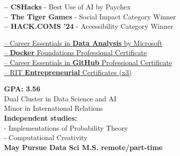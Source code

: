 \documentclass[10pt,a4paper,ragged2e,withhyper]{altacv}
\begin{document}
\begin{paracol}{2}

\textbf{ -- CSHacks} - Best Use of AI by Paychex\\
\textbf{ -- The Tiger Games} - Social Impact Category Winner\\
\textbf{ -- HACK.COMS '24} - Accessibility Category Winner\\

\divider

\href{https://www.linkedin.com/learning/certificates/2cb69378c606fec5a6f3a107b99a896862db392b7a3692f71a6b53af5d5545c5}{ -- Career Essentials in \textbf{Data Analysis} by Microsoft}\\
\href{https://www.linkedin.com/learning/certificates/7b952323152e258ca468c33ddc9ebcf3c55036f58a5cfb3fb9c1410da655aaa5}{ -- \textbf{Docker} Foundations Professional Certificate}\\
\href{https://www.linkedin.com/learning/certificates/7facc28a13405134b3b7fa785303e9b1cf697f32d67f759e89960fbdc8a044d9}{ -- Career Essentials in \textbf{GitHub} Professional Certificate}\\
\href{https://rit.edu/simonecenter}{ -- RIT \textbf{Entrepreneurial} Certificates (x3)}\\

\switchcolumn


\textbf{GPA: 3.56}\\
Dual Cluster in Data Science and AI\\
Minor in International Relations\\
\textbf{Independent studies:}\\
 - Implementations of Probability Theory\\
 - Computational Creativity\\
\medskip
\textbf{May Pursue Data Sci M.S. remote/part-time}




\end{paracol}
\end{document}
